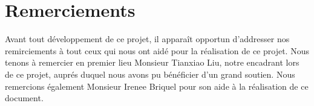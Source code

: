 \documentclass[11pt, french]{article}
\begin{document}


\tableofcontents
\clearpage
\listoffigures


\section*{Remerciements}
Avant tout développement de ce projet,  il apparaît opportun d'addresser nos remirciements à tout ceux qui nous ont aidé pour la réalisation de ce projet. Nous tenons à remercier en premier lieu Monsieur Tianxiao Liu, notre encadrant lors de ce projet, auprés duquel nous avons pu bénéficier d'un grand soutien. Nous remercions également Monsieur Irenee Briquel pour son aide à la réalisation de ce document.

\clearpage

\clearpage

\clearpage

\clearpage

\clearpage

\clearpage


%
%
\end{document}

